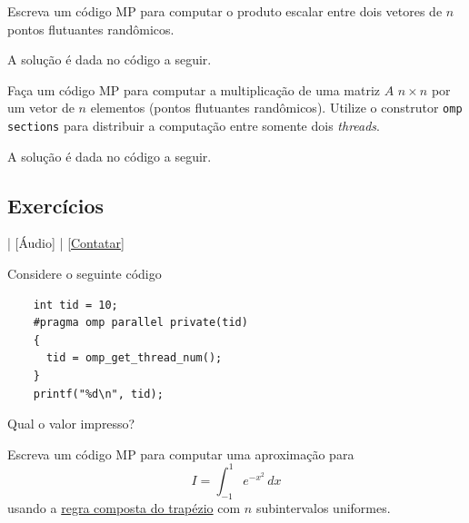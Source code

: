 \begin{exeresol}\label{exeresol:produto_escalar}
  Escreva um código MP para computar o produto escalar entre dois vetores de $n$ pontos flutuantes randômicos.
\end{exeresol}
\begin{resol}
  A solução é dada no código a seguir.

  
\end{resol}

\begin{exeresol}\label{exeresol:cc_AxSecoes}
  Faça um código MP para computar a multiplicação de uma matriz $A$ $n\times n$ por um vetor de $n$ elementos (pontos flutuantes randômicos). Utilize o construtor \verb+omp sections+ para distribuir a computação entre somente dois {\it threads}.
\end{exeresol}
\begin{resol}
  A solução é dada no código a seguir.

  
\end{resol}

\subsection*{Exercícios}

\begin{flushright}
  [Vídeo] | [Áudio] | \href{https://phkonzen.github.io/notas/contato.html}{[Contatar]}
\end{flushright}

\begin{exer}
  Considere o seguinte código
  \begin{lstlisting}
    int tid = 10;
    #pragma omp parallel private(tid)
    {
      tid = omp_get_thread_num();
    }
    printf("%d\n", tid);
  \end{lstlisting}
  Qual o valor impresso?
\end{exer}

\begin{exer}\label{exer:cc_trap}
  Escreva um código MP para computar uma aproximação para
  \begin{equation}
    I = \int_{-1}^{1} e^{-x^2}\,dx
  \end{equation}
  usando a \href{https://phkonzen.github.io/notas/MatematicaNumerica/cap_integr_sec_int_comp.html}{regra composta do trapézio} com $n$ subintervalos uniformes.
\end{exer}


